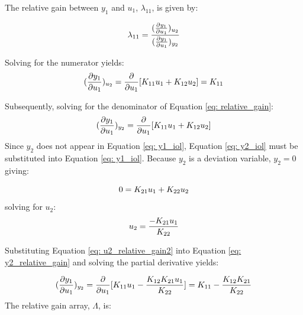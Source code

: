 The relative gain between $y_1$ and $u_1$, $\lambda_{11}$, is given by:

\begin{equation}
    \centering
    {\Large
    \lambda_{11} = \frac{(\frac{\partial y_1}{\partial u_1})_{u_2}}{(\frac{\partial y_1}{\partial u_1})_{y_2}}
    }
    \label{eq: relative_gain}
\end{equation}

Solving for the numerator yields:
\begin{equation}
    \centering
    (\frac{\partial y_1}{\partial u_1})_{u_2} = \frac{\partial}{\partial u_1}[K_{11}u_1 + K_{12}u_2] = K_{11}
\end{equation}

\noindent
Subsequently, solving for the denominator of Equation \ref{eq: relative_gain}:
\begin{equation}
    \centering
    (\frac{\partial y_1}{\partial u_1})_{y_2} = \frac{\partial}{\partial u_1}[K_{11}u_1 + K_{12}u_2]
    \label{eq: y2_relative_gain}
\end{equation}
Since $y_2$ does not appear in Equation \ref{eq: y1_iol}, Equation \ref{eq: y2_iol} must be substituted into Equation \ref{eq: y1_iol}.  Because $y_2$ is a deviation variable, $y_2 = 0$ giving:

\begin{equation}
    \centering
    0 = K_{21}u_1 + K_{22}u_2
    \label{eq: u2_relative_gain1}
\end{equation}
solving for $u_2$:
\begin{equation}
    \centering
    u_2 = \frac{-K_{21}u_1}{K_{22}}
    \label{eq: u2_relative_gain2}
\end{equation}

\noindent
Substituting Equation \ref{eq: u2_relative_gain2} into Equation \ref{eq: y2_relative_gain} and solving the partial derivative yields:

\begin{equation}
    \centering
        (\frac{\partial y_1}{\partial u_1})_{y_2} = \frac{\partial}{\partial u_1}[K_{11}u_1 - \frac{K_{12}K_{21}u_1}{K_{22}}] = K_{11} - \frac{K_{12}K_{21}}{K_{22}}
\end{equation}
The relative gain array, $\Lambda$, is:

